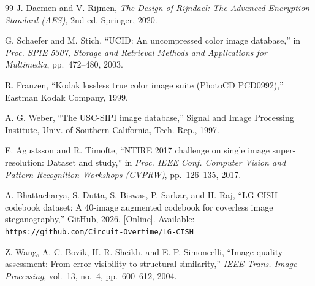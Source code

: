 \documentclass[11pt]{article}
\theoremstyle{definition}
\begin{document}
\begin{thebibliography}{99}
J. Daemen and V. Rijmen,
\emph{The Design of Rijndael: The Advanced Encryption Standard (AES)}, 2nd ed. Springer, 2020.

G. Schaefer and M. Stich,
``UCID: An uncompressed color image database,''
in \emph{Proc. SPIE 5307, Storage and Retrieval Methods and Applications for Multimedia}, pp.~472--480, 2003.

R. Franzen,
``Kodak lossless true color image suite (PhotoCD PCD0992),''
Eastman Kodak Company, 1999.

A. G. Weber,
``The USC-SIPI image database,''
Signal and Image Processing Institute, Univ. of Southern California, Tech. Rep., 1997.

E. Agustsson and R. Timofte,
``NTIRE 2017 challenge on single image super-resolution: Dataset and study,''
in \emph{Proc. IEEE Conf. Computer Vision and Pattern Recognition Workshops (CVPRW)}, pp.~126--135, 2017.

A. Bhattacharya, S. Dutta, S. Biswas, P. Sarkar, and H. Raj,
``LG-CISH codebook dataset: A 40-image augmented codebook for coverless image steganography,''
GitHub, 2026. [Online]. Available: \texttt{https://github.com/Circuit-Overtime/LG-CISH}

Z. Wang, A. C. Bovik, H. R. Sheikh, and E. P. Simoncelli,
``Image quality assessment: From error visibility to structural similarity,''
\emph{IEEE Trans. Image Processing}, vol.~13, no.~4, pp.~600--612, 2004.

\end{thebibliography}
\endgroup
\end{document}
